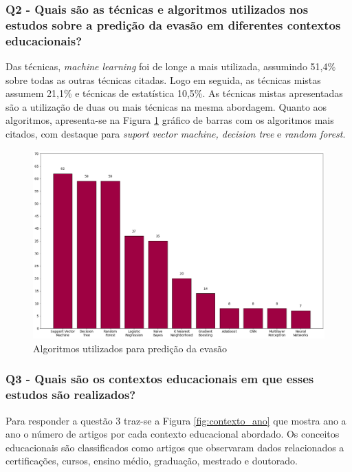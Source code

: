 \subsubsection{Q2 - Quais são as técnicas e algoritmos utilizados nos estudos sobre a predição da evasão em diferentes contextos educacionais?}\label{sub:q2}

Das técnicas, \textit{machine learning} foi de longe a mais utilizada, assumindo 51,4\% sobre todas as outras técnicas citadas. Logo em seguida, as técnicas mistas assumem 21,1\% e técnicas de estatística 10,5\%. As técnicas mistas apresentadas são a utilização de duas ou mais técnicas na mesma abordagem. Quanto aos algoritmos, apresenta-se na Figura \ref{fig:algoritmos} gráfico de barras com os algoritmos mais citados, com destaque para \textit{suport vector machine, decision tree} e \textit{random forest}.


\begin{figure}[H]
\centering
\includegraphics[width=1\textwidth]{Figuras/algoritmos_utilizados.png}
\caption{Algoritmos utilizados para predição da evasão}
\label{fig:algoritmos}
\end{figure}


\subsubsection{Q3 - Quais são os contextos educacionais em que esses estudos são realizados?}\label{sub:q3}

Para responder a questão 3 traz-se a Figura \ref{fig:contexto_ano} que mostra ano a ano o número de artigos por cada contexto educacional abordado. Os conceitos educacionais são classificados como artigos que observaram dados relacionados a certificações, cursos, ensino médio, graduação, mestrado e doutorado.

